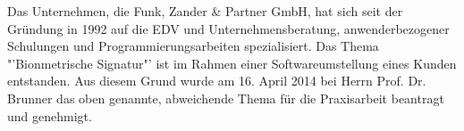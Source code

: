 Das Unternehmen, die Funk, Zander \& Partner GmbH, hat sich seit der Gründung in 1992 auf die EDV und Unternehmensberatung, anwenderbezogener Schulungen und Programmierungsarbeiten spezialisiert. Das Thema "'Bionmetrische Signatur"' ist im Rahmen einer Softwareumstellung eines Kunden entstanden. Aus diesem Grund wurde am 16. April 2014 bei Herrn Prof. Dr. Brunner das oben genannte, abweichende Thema für die Praxisarbeit beantragt und genehmigt.
